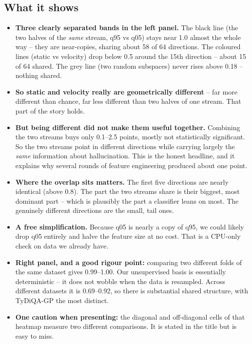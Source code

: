 \documentclass[11pt,a4paper]{article}
\begin{document}
\subsection*{What it shows}
\begin{itemize}
\item \textbf{Three clearly separated bands in the left panel.} The black line (the two halves of
the \emph{same} stream, q95 vs q05) stays near 1.0 almost the whole way -- they are near-copies,
sharing about 58 of 64 directions. The coloured lines (static vs velocity) drop below 0.5 around
the 15th direction -- about 15 of 64 shared. The grey line (two random subspaces) never rises
above 0.18 -- nothing shared.

\item \textbf{So static and velocity really are geometrically different} -- far more different
than chance, far less different than two halves of one stream. That part of the story holds.

\item \textbf{But being different did not make them useful together.} Combining the two streams
buys only 0.1--2.5 points, mostly not statistically significant. So the two streams point in
different directions while carrying largely the \emph{same} information about hallucination. This
is the honest headline, and it explains why several rounds of feature engineering produced about
one point.

\item \textbf{Where the overlap sits matters.} The first five directions are nearly identical
(above 0.8). The part the two streams share is their biggest, most dominant part -- which is
plausibly the part a classifier leans on most. The genuinely different directions are the small,
tail ones.

\item \textbf{A free simplification.} Because q05 is nearly a copy of q95, we could likely drop
q05 entirely and halve the feature size at no cost. That is a CPU-only check on data we already
have.

\item \textbf{Right panel, and a good rigour point:} comparing two different folds of the same
dataset gives 0.99--1.00. Our unsupervised basis is essentially deterministic -- it does not wobble
when the data is resampled. Across different datasets it is 0.69--0.92, so there is substantial
shared structure, with TyDiQA-GP the most distinct.

\item \textbf{One caution when presenting:} the diagonal and off-diagonal cells of that heatmap
measure two different comparisons. It is stated in the title but is easy to miss.
\end{itemize}
\end{document}
